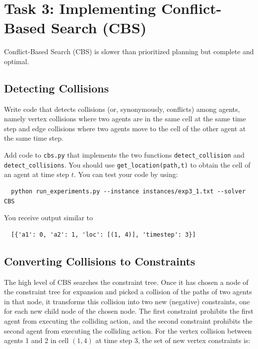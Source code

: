 \documentclass[11pt]{article}
\begin{document}
\section{Task 3: Implementing Conflict-Based Search (CBS)}

Conflict-Based Search (CBS) is slower than prioritized planning but complete and optimal.

\subsection{Detecting Collisions}

Write code that detects collisions (or, synonymously, conflicts) among agents, namely vertex collisions where two agents are in the same cell at the same time step and edge collisions where two agents move to the cell of the other agent at the same time step.

Add code to \texttt{cbs.py} that implements the two functions \texttt{detect_collision} and \texttt{detect_collisions}. You should use \texttt{get_location(path,t)} to obtain the cell of an agent at time step $t$. You can test your code by using:

\begin{verbatim}
  python run_experiments.py --instance instances/exp3_1.txt --solver CBS
\end{verbatim}

You receive output similar to

\begin{verbatim}
  [{'a1': 0, 'a2': 1, 'loc': [(1, 4)], 'timestep': 3}]
\end{verbatim}

\subsection{Converting Collisions to Constraints}

The high level of CBS searches the constraint tree. Once it has chosen a node of the constraint tree for expansion and picked a collision of the paths of two agents in that node, it transforms this collision into two new (negative) constraints, one for each new child node of the chosen node. The first constraint prohibits the first agent from executing the colliding action, and the second constraint prohibits the second agent from executing the colliding action. For the vertex collision between agents 1 and 2 in cell $(1,4)$ at time step 3, the set of new vertex constraints is:
\end{document}
